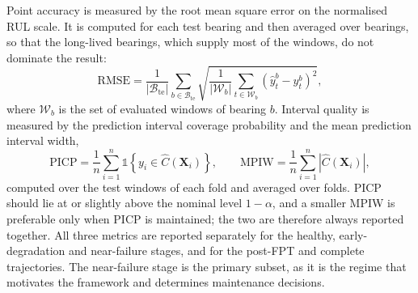 Point accuracy is measured by the root mean square error on the
normalised RUL scale. It is computed for each test bearing and then
averaged over bearings, so that the long-lived bearings, which supply
most of the windows, do not dominate the result:
\begin{equation}
  \mathrm{RMSE} = \frac{1}{|\mathcal{B}_{\mathrm{te}}|}
  \sum_{b \in \mathcal{B}_{\mathrm{te}}}
  \sqrt{ \frac{1}{|\mathcal{W}_b|} \sum_{t \in \mathcal{W}_b}
  \left( \hat{y}^{b}_{t} - y^{b}_{t} \right)^2 } ,
  \label{eq:rmse}
\end{equation}
where $\mathcal{W}_b$ is the set of evaluated windows of bearing $b$.
Interval quality is measured by the prediction interval coverage
probability and the mean prediction interval width,
\begin{equation}
  \mathrm{PICP} = \frac{1}{n} \sum_{i=1}^{n}
  \mathbb{1}\left\{ y_i \in \hat{C}(\mathbf{X}_i) \right\},
  \qquad
  \mathrm{MPIW} = \frac{1}{n} \sum_{i=1}^{n}
  \left| \hat{C}(\mathbf{X}_i) \right| ,
  \label{eq:picp_mpiw}
\end{equation}
computed over the test windows of each fold and averaged over folds.
PICP should lie at or slightly above the nominal level $1-\alpha$, and
a smaller MPIW is preferable only when PICP is maintained; the two
are therefore always reported together. All three metrics are
reported separately for the healthy, early-degradation and
near-failure stages, and for the post-FPT and complete trajectories.
The near-failure stage is the primary subset, as it is the regime that
motivates the framework and determines maintenance decisions.
